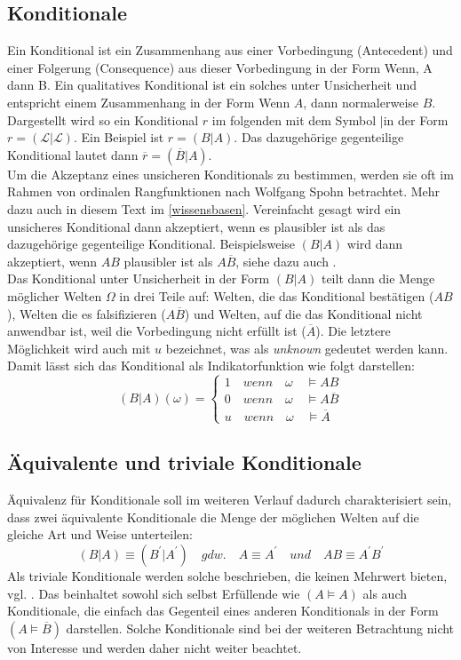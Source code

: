 \documentclass[12pt,a4paper]{article}
\newcommand{\lag}{\mathcal{L}}
\begin{document}
\subsection{Konditionale}
Ein Konditional ist ein Zusammenhang aus einer Vorbedingung (Antecedent) und einer Folgerung (Consequence) aus dieser Vorbedingung in der Form \glqq Wenn, A dann B\grqq . Ein qualitatives Konditional ist ein solches unter  Unsicherheit und entspricht einem Zusammenhang in der Form \glqq Wenn $A$, dann normalerweise $B$\grqq . Dargestellt wird so ein Konditional $r$ im folgenden mit dem Symbol \glqq$|$\grqq \space in der Form $r = ( \lag | \lag)$. Ein Beispiel ist $r = (B|A)$. Das dazugehörige gegenteilige Konditional lautet dann $\overline{r} = (\overline{B}|A)$.\\
Um die Akzeptanz eines unsicheren Konditionals zu bestimmen, werden sie oft im Rahmen von ordinalen Rangfunktionen nach Wolfgang Spohn betrachtet. Mehr dazu auch in diesem Text im  \autoref{wissensbasen}. Vereinfacht gesagt wird ein unsicheres Konditional dann  akzeptiert, wenn es plausibler ist als das dazugehörige gegenteilige Konditional. Beispielsweise $(B|A)$ wird  dann akzeptiert, wenn $A B$ plausibler ist als $A \overline{B}$, siehe dazu auch \cite{isberner14}. \\
Das Konditional unter Unsicherheit in der Form $(B|A)$ teilt dann die Menge möglicher Welten $\Omega$ in drei Teile auf: Welten, die das Konditional bestätigen ($A B$), Welten die es falsifizieren ($A \overline{B}$) und Welten, auf die das Konditional nicht anwendbar ist, weil die Vorbedingung nicht erfüllt ist ($\overline{A}$). Die letztere Möglichkeit wird auch mit $u$ bezeichnet, was als \textit{unknown} gedeutet werden kann. Damit lässt sich das Konditional als Indikatorfunktion wie folgt darstellen:
\[
  (B|A)(\omega)=\begin{cases}
               1 \quad wenn \quad \omega \quad \models AB\\
               0 \quad wenn \quad \omega \quad \models A\overline{B}\\
               u \quad wenn \quad \omega \quad \models \overline{A}
            \end{cases}
\]

\subsection{Äquivalente und triviale Konditionale}
Äquivalenz für Konditionale soll im weiteren Verlauf dadurch charakterisiert sein, dass zwei äquivalente Konditionale die Menge der möglichen Welten auf die gleiche Art und Weise unterteilen:
\begin{equation}
(B|A)\equiv (B^\prime|A^\prime) \quad gdw. \quad A\equiv A^\prime \quad und \quad AB \equiv A^\prime B^\prime
\end{equation}
Als triviale Konditionale werden solche beschrieben, die keinen Mehrwert bieten, vgl. \cite{beierle19}. Das beinhaltet sowohl sich selbst Erfüllende wie $(A \models A)$ als auch Konditionale, die einfach das Gegenteil eines anderen Konditionals in der Form $(A \models \overline{B})$ darstellen. Solche Konditionale sind bei der weiteren Betrachtung nicht von Interesse und werden daher nicht weiter beachtet.
\end{document}
